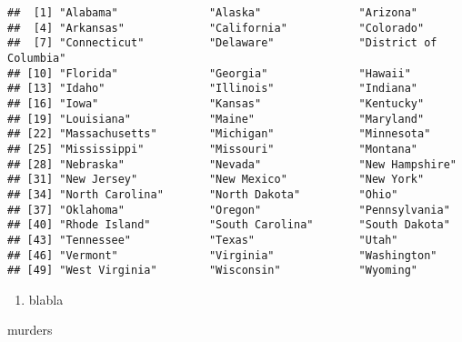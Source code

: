 \documentclass[
]{article}
\newenvironment{Shaded}{\begin{snugshade}}{\end{snugshade}}
\newcommand{\NormalTok}[1]{#1}
\newcommand{\SpecialCharTok}[1]{\textcolor[rgb]{0.00,0.00,0.00}{#1}}
\providecommand{\tightlist}{%
  \setlength{\itemsep}{0pt}\setlength{\parskip}{0pt}}
\begin{document}
\begin{Shaded}
\end{Shaded}

\begin{verbatim}
##  [1] "Alabama"              "Alaska"               "Arizona"             
##  [4] "Arkansas"             "California"           "Colorado"            
##  [7] "Connecticut"          "Delaware"             "District of Columbia"
## [10] "Florida"              "Georgia"              "Hawaii"              
## [13] "Idaho"                "Illinois"             "Indiana"             
## [16] "Iowa"                 "Kansas"               "Kentucky"            
## [19] "Louisiana"            "Maine"                "Maryland"            
## [22] "Massachusetts"        "Michigan"             "Minnesota"           
## [25] "Mississippi"          "Missouri"             "Montana"             
## [28] "Nebraska"             "Nevada"               "New Hampshire"       
## [31] "New Jersey"           "New Mexico"           "New York"            
## [34] "North Carolina"       "North Dakota"         "Ohio"                
## [37] "Oklahoma"             "Oregon"               "Pennsylvania"        
## [40] "Rhode Island"         "South Carolina"       "South Dakota"        
## [43] "Tennessee"            "Texas"                "Utah"                
## [46] "Vermont"              "Virginia"             "Washington"          
## [49] "West Virginia"        "Wisconsin"            "Wyoming"
\end{verbatim}

\begin{enumerate}
\def\labelenumi{\alph{enumi}.}
\setcounter{enumi}{2}
\tightlist
\item
  blabla
\end{enumerate}

\begin{Shaded}
\begin{Highlighting}[]
\NormalTok{murders}
\end{Highlighting}
\end{Shaded}
\end{document}

